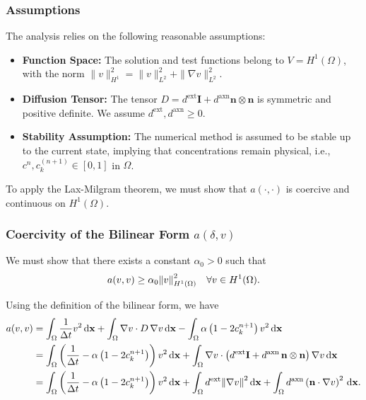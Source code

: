 \documentclass[12pt, a4paper, twoside, openright]{report}
\begin{document}
\subsubsection{Assumptions}
The analysis relies on the following reasonable assumptions:
\begin{itemize}
  \item \textbf{Function Space:} The solution and test functions belong to $V = H^1(\Omega)$, with the norm $\|v\|_{H^1}^2 = \|v\|_{L^2}^2 + \|\nabla v\|_{L^2}^2$.
  \item \textbf{Diffusion Tensor:} The tensor $D = d^{\text{ext}} \mathbf{I} + d^{\text{axn}} \mathbf{n} \otimes \mathbf{n}$ is symmetric and positive definite. We assume $d^{\text{ext}}, d^{\text{axn}} \ge 0$.
  \item \textbf{Stability Assumption:} The numerical method is assumed to be stable up to the current state, implying that concentrations remain physical, i.e., $c^n, c_k^{(n+1)} \in [0, 1]$ in $\Omega$.
\end{itemize}
To apply the Lax-Milgram theorem, we must show that $a(\cdot, \cdot)$ is coercive and continuous on $H^1(\Omega)$.

\subsubsection{Coercivity of the Bilinear Form $a(\delta, v)$}

We must show that there exists a constant $\alpha_0 > 0$ such that 
\[
a(v,v) \ge \alpha_0 \norm{v}_{H^1(\Omega)}^2 \quad \forall v \in H^1(\Omega).
\]

Using the definition of the bilinear form, we have
\begin{align*}
  a(v,v) 
  &= \int_{\Omega} \frac{1}{\Delta t} v^2 \, \dd \vb{x} + \int_{\Omega} \vb{\nabla} v \cdot D \, \vb{\nabla} v \, \dd \vb{x} - \int_{\Omega} \alpha \left(1 - 2c_k^{n+1}\right) v^2 \, \dd \vb{x} \\
  &= \int_{\Omega} \left( \frac{1}{\Delta t} - \alpha \left(1 - 2c_k^{n+1}\right) \right) v^2 \, \dd \vb{x} 
     + \int_{\Omega} \vb{\nabla} v \cdot \left( d^{\mathrm{ext}} \mathbf{I} + d^{\mathrm{axn}} \, \vb{n} \otimes \vb{n} \right) \vb{\nabla} v \, \dd \vb{x} \\
  &= \int_{\Omega} \left( \frac{1}{\Delta t} - \alpha \left(1 - 2c_k^{n+1}\right) \right) v^2 \, \dd \vb{x} 
     + \int_{\Omega} d^{\mathrm{ext}} \norm{\vb{\nabla} v}^2 \, \dd \vb{x} 
     + \int_{\Omega} d^{\mathrm{axn}} \left( \vb{n} \cdot \vb{\nabla} v \right)^2 \, \dd \vb{x}.
\end{align*}
\end{document}
